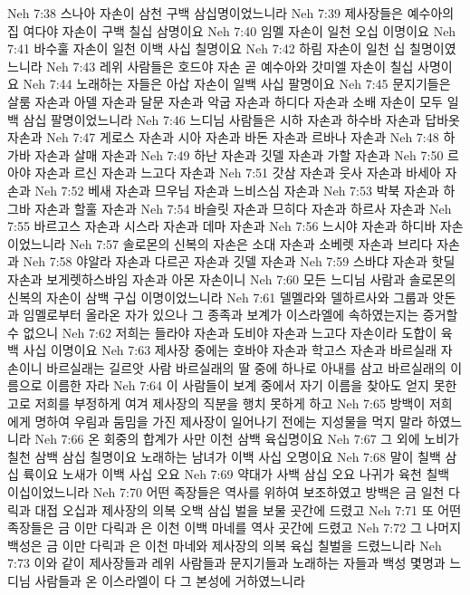 Neh 7:38  스나아 자손이 삼천 구백 삼십명이었느니라
Neh 7:39  제사장들은 예수아의 집 여다야 자손이 구백 칠십 삼명이요
Neh 7:40  임멜 자손이 일천 오십 이명이요
Neh 7:41  바수훌 자손이 일천 이백 사십 칠명이요
Neh 7:42  하림 자손이 일천 십 칠명이였느니라
Neh 7:43  레위 사람들은 호드야 자손 곧 예수아와 갓미엘 자손이 칠십 사명이요
Neh 7:44  노래하는 자들은 아삽 자손이 일백 사십 팔명이요
Neh 7:45  문지기들은 살룸 자손과 아델 자손과 달문 자손과 악굽 자손과 하디다 자손과 소배 자손이 모두 일백 삼십 팔명이었느니라
Neh 7:46  느디님 사람들은 시하 자손과 하수바 자손과 답바옷 자손과
Neh 7:47  게로스 자손과 시아 자손과 바돈 자손과 르바나 자손과
Neh 7:48  하가바 자손과 살매 자손과
Neh 7:49  하난 자손과 깃델 자손과 가할 자손과
Neh 7:50  르아야 자손과 르신 자손과 느고다 자손과
Neh 7:51  갓삼 자손과 웃사 자손과 바세아 자손과
Neh 7:52  베새 자손과 므우님 자손과 느비스심 자손과
Neh 7:53  박북 자손과 하그바 자손과 할훌 자손과
Neh 7:54  바슬릿 자손과 므히다 자손과 하르사 자손과
Neh 7:55  바르고스 자손과 시스라 자손과 데마 자손과
Neh 7:56  느시야 자손과 하디바 자손이었느니라
Neh 7:57  솔로몬의 신복의 자손은 소대 자손과 소베렛 자손과 브리다 자손과
Neh 7:58  야알라 자손과 다르곤 자손과 깃델 자손과
Neh 7:59  스바댜 자손과 핫딜 자손과 보게렛하스바임 자손과 아몬 자손이니
Neh 7:60  모든 느디님 사람과 솔로몬의 신복의 자손이 삼백 구십 이명이었느니라
Neh 7:61  델멜라와 델하르사와 그룹과 앗돈과 임멜로부터 올라온 자가 있으나 그 종족과 보계가 이스라엘에 속하였는지는 증거할 수 없으니
Neh 7:62  저희는 들라야 자손과 도비야 자손과 느고다 자손이라 도합이 육백 사십 이명이요
Neh 7:63  제사장 중에는 호바야 자손과 학고스 자손과 바르실래 자손이니 바르실래는 길르앗 사람 바르실래의 딸 중에 하나로 아내를 삼고 바르실래의 이름으로 이름한 자라
Neh 7:64  이 사람들이 보계 중에서 자기 이름을 찾아도 얻지 못한고로 저희를 부정하게 여겨 제사장의 직분을 행치 못하게 하고
Neh 7:65  방백이 저희에게 명하여 우림과 둠밈을 가진 제사장이 일어나기 전에는 지성물을 먹지 말라 하였느니라
Neh 7:66  온 회중의 합계가 사만 이천 삼백 육십명이요
Neh 7:67  그 외에 노비가 칠천 삼백 삼십 칠명이요 노래하는 남녀가 이백 사십 오명이요
Neh 7:68  말이 칠백 삼십 륙이요 노새가 이백 사십 오요
Neh 7:69  약대가 사백 삼십 오요 나귀가 육천 칠백 이십이었느니라
Neh 7:70  어떤 족장들은 역사를 위하여 보조하였고 방백은 금 일천 다릭과 대접 오십과 제사장의 의복 오백 삼십 벌을 보물 곳간에 드렸고
Neh 7:71  또 어떤 족장들은 금 이만 다릭과 은 이천 이백 마네를 역사 곳간에 드렸고
Neh 7:72  그 나머지 백성은 금 이만 다릭과 은 이천 마네와 제사장의 의복 육십 칠벌을 드렸느니라
Neh 7:73  이와 같이 제사장들과 레위 사람들과 문지기들과 노래하는 자들과 백성 몇명과 느디님 사람들과 온 이스라엘이 다 그 본성에 거하였느니라
